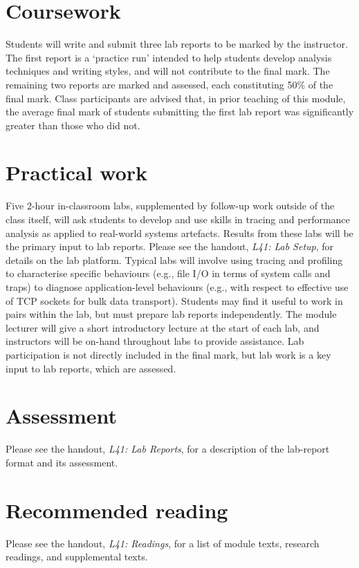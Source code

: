 \documentclass[a4paper,10pt]{article}
\begin{document}
\section{Coursework}

Students will write and submit three lab reports to be marked by the
instructor.
The first report is a `practice run' intended to help students develop 
analysis techniques and writing styles, and will not contribute to the final
mark.
The remaining two reports are marked and assessed, each constituting 50\% of
the final mark.
Class participants are advised that, in prior teaching of this module, the
average final mark of students submitting the first lab report was
significantly greater than those who did not.

\section{Practical work}

Five 2-hour in-classroom labs, supplemented by follow-up work outside of the
class itself, will ask students to develop and use skills in tracing and 
performance analysis as applied to real-world systems artefacts.
Results from these labs will be the primary input to lab reports.
Please see the handout, \textit{L41: Lab Setup}, for details on the lab
platform.
Typical labs will involve using tracing and profiling to characterise specific
behaviours (e.g., file I/O in terms of system calls and traps) to diagnose
application-level behaviours (e.g., with respect to effective use of TCP
sockets for bulk data transport).
Students may find it useful to work in pairs within the lab, but must prepare
lab reports independently.
The module lecturer will give a short introductory lecture at the start of
each lab, and instructors will be on-hand throughout labs to provide
assistance.
Lab participation is not directly included in the final mark, but lab work is
a key input to lab reports, which are assessed.

\section{Assessment}

Please see the handout, \textit{L41: Lab Reports}, for a description of the
lab-report format and its assessment.

\section{Recommended reading}

Please see the handout, \textit{L41: Readings}, for a list of module texts,
research readings, and supplemental texts.
\end{document}
